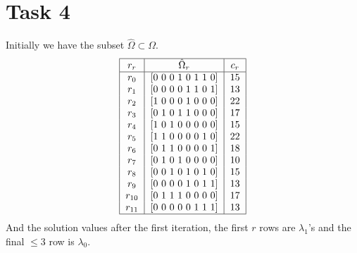 \documentclass{article}
\begin{document}
    \section*{Task 4}
    Initially we have the subset $\hat{\Omega} \subset \Omega$.
    \[
        \begin{tabular}{ |c| c|c|c|c|c|c|c|c | }
            \hline
            $r_r$ &     $\hat{\Omega}_r$    &  $c_r$ \\
            \hline
            $r_0$ &     [0 0 0 1 0 1 1 0]   &  $15$ \\
            $r_1$ &     [0 0 0 0 1 1 0 1]   &  $13$ \\
            $r_2$ &     [1 0 0 0 1 0 0 0]   &  $22$ \\
            $r_3$ &     [0 1 0 1 1 0 0 0]   &  $17$ \\
            $r_4$ &     [1 0 1 0 0 0 0 0]   &  $15$ \\
            $r_5$ &     [1 1 0 0 0 0 1 0]   &  $22$ \\
            $r_6$ &     [0 1 1 0 0 0 0 1]   &  $18$ \\
            $r_7$ &     [0 1 0 1 0 0 0 0]   &  $10$ \\
            $r_8$ &     [0 0 1 0 1 0 1 0]   &  $15$ \\
            $r_9$ &     [0 0 0 0 1 0 1 1]   &  $13$ \\
            $r_{10}$ &  [0 1 1 1 0 0 0 0]   &  $17$ \\
            $r_{11}$ &  [0 0 0 0 0 1 1 1]   &  $13$ \\
            \hline
        \end{tabular}
    \]
    And the solution values after the first iteration, the first $r$ rows are $\lambda_1$'s and the final $\leq 3$ row is $\lambda_0$.
\end{document}
